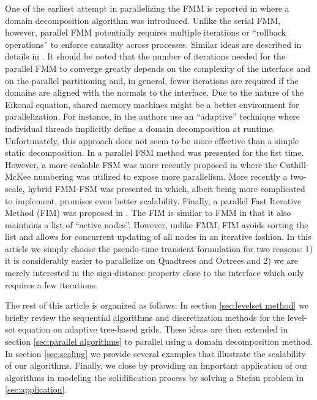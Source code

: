 One of the earliest attempt in parallelizing the FMM is reported in \cite{Herrmann:03:A-domain-decompositi} where a domain decomposition algorithm was introduced. Unlike the serial FMM, however, parallel FMM potentially requires multiple iterations or ``rollback operations'' to enforce causality across processes. Similar ideas are described in details in \cite{Tugurlan:08:Fast-marching-method}. It should be noted that the number of iterations needed for the parallel FMM to converge greatly depends on the complexity of the interface and on the parallel partitioning and, in general, fewer iterations are required if the domains are aligned with the normals to the interface. Due to the nature of the Eikonal equation, shared memory machines might be a better environment for parallelization. For instance, in \cite{Breus;Cristiani;Gwosdek;etal:11:An-adaptive-domain-d} the authors use an ``adaptive'' technique where individual threads implicitly define a domain decomposition at runtime. Unfortunately, this approach does not seem to be more effective than a simple static decomposition. In \cite{Zhao:07:Parallel-implementat} a parallel FSM method was presented for the fist time. However, a more scalable FSM was more recently proposed in \cite{Detrixhe;Gibou;Min:13:A-parallel-fast-swee} where the Cuthill-McKee numbering was utilized to expose more parallelism. More recently a two-scale, hybrid FMM-FSM was presented in \cite{Chacon;Vladimirsky:13:A-parallel-Heap-Cell} which, albeit being more complicated to implement, promises even better scalability. Finally, a parallel Fast Iterative Method (FIM) was proposed in \cite{Jeong;Whitaker:08:A-fast-iterative-met}. The FIM is similar to FMM in that it also maintains a list of ``active nodes''. However, unlike FMM, FIM avoids sorting the list and allows for concurrent updating of all nodes in an iterative fashion. In this article we simply choose the pseudo-time transient formulation for two reasons: 1) it is considerably easier to parallelize on Quadtrees and Octrees and 2) we are merely interested in the sign-distance property close to the interface which only requires a few iterations.

The rest of this article is organized as follows: In section \ref{sec:levelset method} we briefly review the sequential algorithms and discretization methods for the level-set equation on adaptive tree-based grids. These ideas are then extended in section \ref{sec:parallel algorithms} to parallel using a domain decomposition method. In section \ref{sec:scaling} we provide several examples that illustrate the scalability of our algorithms. Finally, we close by providing an important application of our algorithms in modeling the solidification process by solving a Stefan problem in \ref{sec:application}.
